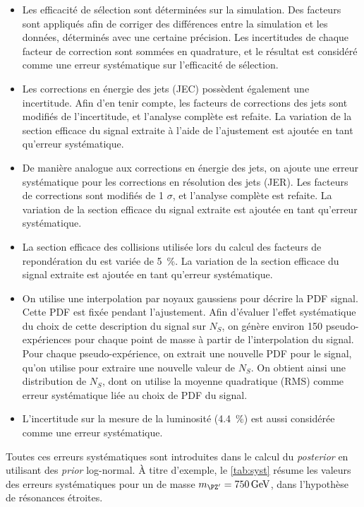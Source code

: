 \begin{itemize}
  \item Les efficacité de sélection sont déterminées sur la simulation. Des facteurs sont appliqués afin de corriger des différences entre la simulation et les données, déterminés avec une certaine précision. Les incertitudes de chaque facteur de correction sont sommées en quadrature, et le résultat est considéré comme une erreur systématique sur l'efficacité de sélection.
  \item Les corrections en énergie des jets (JEC) possèdent également une incertitude. Afin d'en tenir compte, les facteurs de corrections des jets sont modifiés de \pm{} l'incertitude, et l'analyse complète est refaite. La variation de la section efficace du signal extraite à l'aide de l'ajustement est ajoutée en tant qu'erreur systématique.
  \item De manière analogue aux corrections en énergie des jets, on ajoute une erreur systématique pour les corrections en résolution des jets (JER). Les facteurs de corrections sont modifiés de \pm{} 1 $\sigma$, et l'analyse complète est refaite. La variation de la section efficace du signal extraite est ajoutée en tant qu'erreur systématique.
  \item La section efficace des collisions \Pproton{}\Pproton{} utilisée lors du calcul des facteurs de repondération du \pu est variée de \pm{} \SI{5}{\percent}. La variation de la section efficace du signal extraite est ajoutée en tant qu'erreur systématique.
  \item On utilise une interpolation par noyaux gaussiens pour décrire la PDF signal. Cette PDF est fixée pendant l'ajustement. Afin d'évaluer l'effet systématique du choix de cette description du signal sur $N_S$, on génère environ 150 pseudo-expériences pour chaque point de masse à partir de l'interpolation du signal. Pour chaque pseudo-expérience, on extrait une nouvelle PDF pour le signal, qu'on utilise pour extraire une nouvelle valeur de $N_S$. On obtient ainsi une distribution de $N_S$, dont on utilise la moyenne quadratique (RMS) comme erreur systématique liée au choix de PDF du signal.
  \item L'incertitude sur la mesure de la luminosité (\SI{4.4}{\percent}) est aussi considérée comme une erreur systématique.
\end{itemize}

Toutes ces erreurs systématiques sont introduites dans le calcul du \emph{posterior} en utilisant des \emph{prior} log-normal. À titre d'exemple, le \cref{tab:syst} résume les valeurs des erreurs systématiques pour un \zprime de masse $\mzp = \SI{750}{\GeV}$, dans l'hypothèse de résonances étroites.

